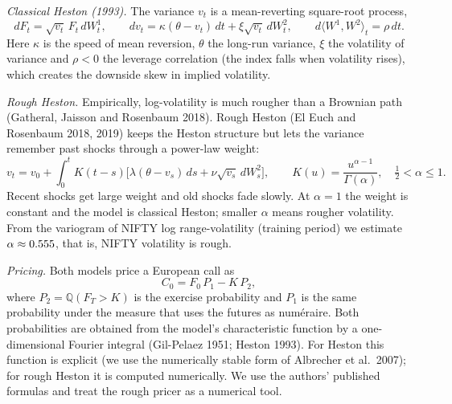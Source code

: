 \documentclass[10pt,leqno]{amsart}
\newcommand{\Q}{\mathbb{Q}}
\begin{document}
\emph{Classical Heston (1993).} The variance $v_t$ is a mean-reverting square-root process,
\begin{equation}\label{eq:heston}
dF_t=\sqrt{v_t}\,F_t\,dW^1_t,\qquad dv_t=\kappa(\theta-v_t)\,dt+\xi\sqrt{v_t}\,dW^2_t,\qquad d\langle W^1,W^2\rangle_t=\rho\,dt .
\end{equation}
Here $\kappa$ is the speed of mean reversion, $\theta$ the long-run variance, $\xi$ the volatility of variance and $\rho<0$ the leverage correlation (the index falls when volatility rises), which creates the downside skew in implied volatility.

\emph{Rough Heston.} Empirically, log-volatility is much rougher than a Brownian path (Gatheral, Jaisson and Rosenbaum 2018). Rough Heston (El Euch and Rosenbaum 2018, 2019) keeps the Heston structure but lets the variance remember past shocks through a power-law weight:
\[
v_t=v_0+\int_0^t K(t-s)\Big[\lambda(\theta-v_s)\,ds+\nu\sqrt{v_s}\,dW^2_s\Big],\qquad K(u)=\frac{u^{\alpha-1}}{\Gamma(\alpha)},\quad \tfrac12<\alpha\le 1 .
\]
Recent shocks get large weight and old shocks fade slowly. At $\alpha=1$ the weight is constant and the model is classical Heston; smaller $\alpha$ means rougher volatility. From the variogram of NIFTY log range-volatility (training period) we estimate $\alpha\approx0.555$, that is, NIFTY volatility is rough.

\emph{Pricing.} Both models price a European call as
\[
C_0=F_0\,P_1-K\,P_2 ,
\]
where $P_2=\Q(F_T>K)$ is the exercise probability and $P_1$ is the same probability under the measure that uses the futures as numéraire. Both probabilities are obtained from the model's characteristic function by a one-dimensional Fourier integral (Gil-Pelaez 1951; Heston 1993). For Heston this function is explicit (we use the numerically stable form of Albrecher et al.\ 2007); for rough Heston it is computed numerically. We use the authors' published formulas and treat the rough pricer as a numerical tool.
\end{document}
